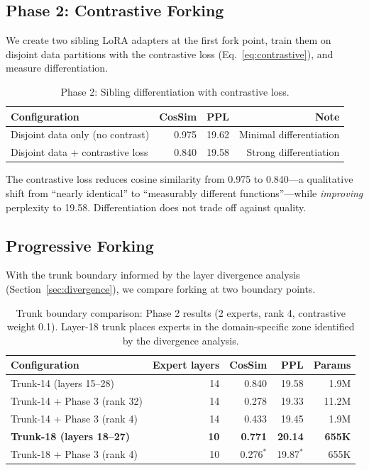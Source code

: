\documentclass{article}
\begin{document}
\subsection{Phase 2: Contrastive Forking}

We create two sibling LoRA adapters at the first fork point, train them on
disjoint data partitions with the contrastive loss (Eq.~\ref{eq:contrastive}),
and measure differentiation.

\begin{table}[h]
\centering
\caption{Phase 2: Sibling differentiation with contrastive loss.}
\label{tab:phase2}
\begin{tabular}{@{}lrrr@{}}
\toprule
Configuration & CosSim & PPL & Note \\
\midrule
Disjoint data only (no contrast) & 0.975 & 19.62 & Minimal differentiation \\
Disjoint data + contrastive loss & 0.840 & 19.58 & Strong differentiation \\
\bottomrule
\end{tabular}
\end{table}

The contrastive loss reduces cosine similarity from 0.975 to 0.840---a
qualitative shift from ``nearly identical'' to ``measurably different
functions''---while \emph{improving} perplexity to 19.58. Differentiation does
not trade off against quality.

\subsection{Progressive Forking}
\label{sec:forking}

With the trunk boundary informed by the layer divergence analysis
(Section~\ref{sec:divergence}), we compare forking at two boundary points.

\begin{table}[h]
\centering
\caption{Trunk boundary comparison: Phase 2 results (2 experts, rank 4,
contrastive weight 0.1). Layer-18 trunk places experts in the domain-specific
zone identified by the divergence analysis.}
\label{tab:trunk-comparison}
\begin{tabular}{@{}lrrrr@{}}
\toprule
Configuration & Expert layers & CosSim & PPL & Params \\
\midrule
Trunk-14 (layers 15--28) & 14 & 0.840 & 19.58 & 1.9M \\
Trunk-14 + Phase 3 (rank 32) & 14 & 0.278 & 19.33 & 11.2M \\
Trunk-14 + Phase 3 (rank 4) & 14 & 0.433 & 19.45 & 1.9M \\
\textbf{Trunk-18 (layers 18--27)} & \textbf{10} & \textbf{0.771} & \textbf{20.14} & \textbf{655K} \\
Trunk-18 + Phase 3 (rank 4) & 10 & 0.276$^*$ & 19.87$^*$ & 655K \\
\bottomrule
\end{tabular}
\end{table}
\end{document}
